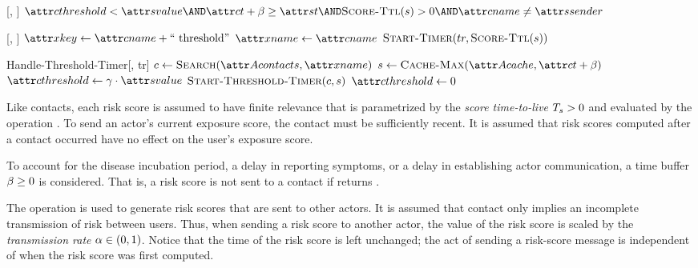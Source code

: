 %
\begin{function}{\nShouldReceive}[\vContact, \vScore]
    \State \Return $\aContactThreshold < \aScoreValue \AND \aContactTime + \pTimeBuffer \geq \aScoreTime \AND \cScoreTtl[\vScore] > 0 \AND \aContactName \notEquals \aScoreSender$
\end{function}
%
%
\begin{function}{\nStartThresholdTimer}[\vContact, \vScore]
    \State $\aTimerKey \assign \aContactName + $
    \State $\aTimerName \assign \aContactName$
    \State $\cStartTimer[tr, \cScoreTtl[\vScore]]$
\end{function}
%
\begin{function}{Handle-Threshold-Timer}[\vActor, tr]
    \State $\vContact \assign \cSearch[\aActorContacts, \aTimerName]$
    \If{$\vContact \notEquals \nil$}
    	\State $\vScore \assign \cCacheMax[\aActorCache, \aContactTime + \pTimeBuffer]$
    	\If{$\vScore \notEquals \nil \AND \cScoreTtl[\vScore] > 0$}
    		\State $\aContactThreshold \assign \pSendCoeff \cdot \aScoreValue$
    		\State $\cStartThresholdTimer[\vContact, \vScore]$
    	\Else
    		\State $\aContactThreshold {}$
    	\EndIf
    \EndIf
\end{function}
%
Like contacts, each risk score is assumed to have finite relevance that is parametrized by the \emph{score time-to-live} $T_s > 0$ and evaluated by the operation . To send an actor's current exposure score, the contact must be sufficiently recent. It is assumed that risk scores computed after a contact occurred have no effect on the user's exposure score.

To account for the disease incubation period, a delay in reporting symptoms, or a delay in establishing actor communication, a time buffer $\pTimeBuffer {}$ is considered. That is, a risk score is not sent to a contact if  returns \false.

The  operation is used to generate risk scores that are sent to other actors. It is assumed that contact only implies an incomplete transmission of risk between users. Thus, when sending a risk score to another actor, the value of the risk score is scaled by the \emph{transmission rate} $\alpha \in (0, 1)$. Notice that the time of the risk score is left unchanged; the act of sending a risk-score message is independent of when the risk score was first computed.

